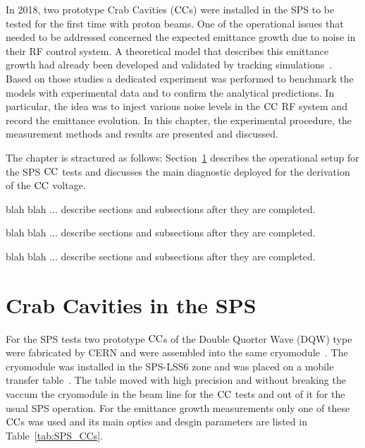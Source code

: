 In 2018, two prototype Crab Cavities (${\mathrm{CC}}$s) were installed in the SPS to be tested for the first time with proton beams. One of the operational issues that needed to be addressed concerned the expected emittance growth due to noise in their RF control system. A theoretical model that describes this emittance growth had already been developed and validated by tracking simulations~\cite{PhysRevSTAB.18.101001}. Based on those studies a dedicated experiment was performed to benchmark the models with experimental data and to confirm the analytical predictions. In particular, the idea was to inject various noise levels in the ${\mathrm{CC}}$ RF system and record the emittance evolution. In this chapter, the experimental procedure, the measurement methods and results are presented and discussed.
 
The chapter is stractured as follows: Section~\ref{sec:CC_SPS_setup} describes the operational setup for the SPS ${\mathrm{CC}}$ tests and discusses the main diagnostic deployed for the derivation of the ${\mathrm{CC}}$ voltage.

blah blah ... describe sections and subsections after they are completed.

blah blah ... describe sections and subsections after they are completed.

blah blah ... describe sections and subsections after they are completed.

\section{Crab Cavities in the SPS}\label{sec:CC_SPS_setup}

For the SPS tests two prototype ${\mathrm{CC}}$s of the Double Quorter Wave (DQW) type were fabricated by CERN and were assembled into the same cryomodule~\cite{Zanoni:2017}. The cryomodule was installed in the SPS-LSS6 zone and was placed on a mobile transfer table~\cite{Garlaschè:2648553}. The table moved with high precision and without breaking the vaccum the cryomodule in the beam line for the ${\mathrm{CC}}$ tests and out of it for the usual SPS operation. For the emittance growth measurements only one of these ${\mathrm{CC}}$s was used and its main optics and desgin parameters are listed in Table~\ref{tab:SPS_CCs}. 